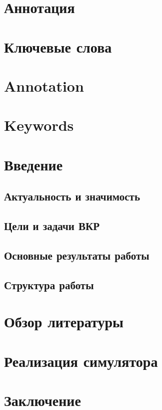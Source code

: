 
\section*{Аннотация}


\section*{Ключевые слова}


\section*{Annotation}

\section*{Keywords}

\newpage 

\section{Введение}

\subsection{Актуальность и значимость}

\subsection{Цели и задачи ВКР}

\subsection{Основные результаты работы}

\subsection{Структура работы}


\section{Обзор литературы}

\section{Реализация симулятора}

\section{Заключение}
